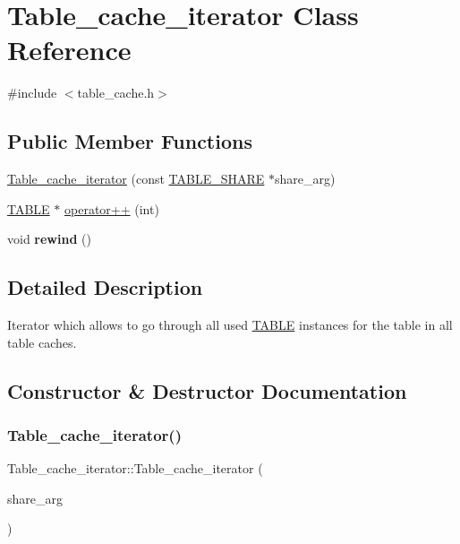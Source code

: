 \hypertarget{classTable__cache__iterator}{}\section{Table\+\_\+cache\+\_\+iterator Class Reference}
\label{classTable__cache__iterator}


{\ttfamily \#include $<$table\+\_\+cache.\+h$>$}

\subsection*{Public Member Functions}
\begin{DoxyCompactItemize}
\item 
\mbox{\hyperlink{classTable__cache__iterator_a5c702829feb5c5044cc03dd0597b4232}{Table\+\_\+cache\+\_\+iterator}} (const \mbox{\hyperlink{structTABLE__SHARE}{T\+A\+B\+L\+E\+\_\+\+S\+H\+A\+RE}} $\ast$share\+\_\+arg)
\item 
\mbox{\hyperlink{structTABLE}{T\+A\+B\+LE}} $\ast$ \mbox{\hyperlink{classTable__cache__iterator_af5dc1e3ac1faa2b8639e221f774d4a19}{operator++}} (int)
\item 
\mbox{\label{classTable__cache__iterator_ac8db937191dc68e89fb7c5653a90d3b8}} 
void {\bfseries rewind} ()
\end{DoxyCompactItemize}


\subsection{Detailed Description}
Iterator which allows to go through all used \mbox{\hyperlink{structTABLE}{T\+A\+B\+LE}} instances for the table in all table caches. 

\subsection{Constructor \& Destructor Documentation}
\mbox{\label{classTable__cache__iterator_a5c702829feb5c5044cc03dd0597b4232}} 
\subsubsection{\texorpdfstring{Table\+\_\+cache\+\_\+iterator()}{Table\_cache\_iterator()}}
{\footnotesize\ttfamily Table\+\_\+cache\+\_\+iterator\+::\+Table\+\_\+cache\+\_\+iterator (\begin{DoxyParamCaption}\item[{const \mbox{\hyperlink{structTABLE__SHARE}{T\+A\+B\+L\+E\+\_\+\+S\+H\+A\+RE}} $\ast$}]{share\+\_\+arg }\end{DoxyParamCaption})\hspace{0.3cm}{\ttfamily [inline]}}

